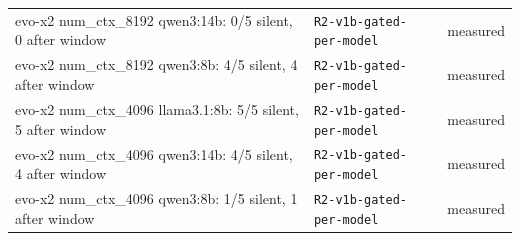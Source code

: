 \begin{longtable}{>{\raggedright\arraybackslash}p{}>{\raggedright\arraybackslash}p{}>{\raggedright\arraybackslash}p{}}
\small evo-x2 num\_ctx\_8192 qwen3:14b: 0/5 silent, 0 after window & {\footnotesize \texttt{R2-\allowbreak{}v1b-\allowbreak{}gated-\allowbreak{}per-\allowbreak{}model}} & \small measured \\

\small evo-x2 num\_ctx\_8192 qwen3:8b: 4/5 silent, 4 after window & {\footnotesize \texttt{R2-\allowbreak{}v1b-\allowbreak{}gated-\allowbreak{}per-\allowbreak{}model}} & \small measured \\

\small evo-x2 num\_ctx\_4096 llama3.1:8b: 5/5 silent, 5 after window & {\footnotesize \texttt{R2-\allowbreak{}v1b-\allowbreak{}gated-\allowbreak{}per-\allowbreak{}model}} & \small measured \\

\small evo-x2 num\_ctx\_4096 qwen3:14b: 4/5 silent, 4 after window & {\footnotesize \texttt{R2-\allowbreak{}v1b-\allowbreak{}gated-\allowbreak{}per-\allowbreak{}model}} & \small measured \\

\small evo-x2 num\_ctx\_4096 qwen3:8b: 1/5 silent, 1 after window & {\footnotesize \texttt{R2-\allowbreak{}v1b-\allowbreak{}gated-\allowbreak{}per-\allowbreak{}model}} & \small measured \\

\bottomrule
\end{longtable}

